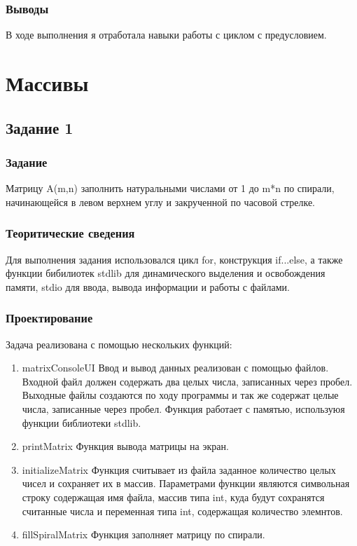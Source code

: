 \documentclass[12pt,a4paper]{report}
\begin{document}
\subsection{Выводы}
В ходе выполнения я отработала навыки работы с циклом с предусловием. 

%

%

\chapter{Массивы}
\section{Задание 1}
\subsection{Задание}
Матрицу A(m,n) заполнить натуральными числами от 1 до m*n по спирали, начинающейся в левом верхнем углу и закрученной по часовой стрелке.
\subsection{Теоритические сведения}
	Для выполнения задания использовался цикл for, конструкция if...else, а также функции бибилиотек stdlib для динамического выделения и освобождения памяти, stdio для ввода, вывода информации и работы с файлами.
\subsection{Проектирование}
	Задача реализована с помощью нескольких функций:
\begin{enumerate}
	\item matrixConsoleUI
	Ввод и вывод данных реализован с помощью файлов. Входной файл должен содержать два целых числа, записанных через пробел. Выходные файлы создаются по ходу программы и так же содержат целые числа, записанные через пробел. 
	Функция работает с памятью, используюя функции библиотеки stdlib.
	\item printMatrix
	Функция вывода матрицы на экран.
	\item initializeMatrix
	Функция считывает из файла заданное количество целых чисел и сохраняет их в массив.
	Параметрами функции являются символьная строку содержащая имя файла, массив типа int, куда будут сохранятся считанные числа и переменная типа int, содержащая количество элемнтов.
	\item fillSpiralMatrix	
	Функция заполняет матрицу по спирали.
\end{enumerate}
\end{document}
